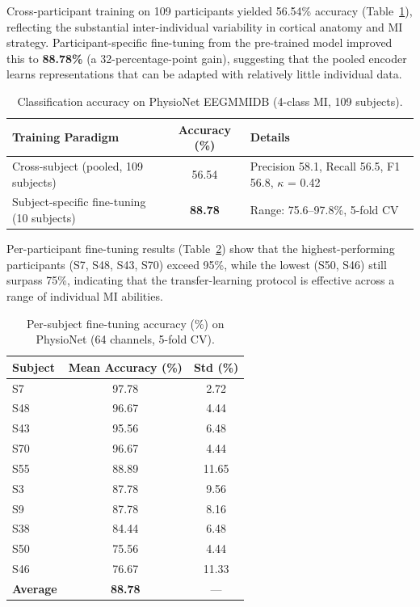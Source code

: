 \documentclass[12pt, a4paper]{article}
\begin{document}
Cross-participant training on 109 participants yielded 56.54\% accuracy (Table~\ref{tab:physionet_results}), reflecting the substantial inter-individual variability in cortical anatomy and MI strategy. Participant-specific fine-tuning from the pre-trained model improved this to \textbf{88.78\%} (a 32-percentage-point gain), suggesting that the pooled encoder learns representations that can be adapted with relatively little individual data.

\begin{table}[htbp]
\centering
\caption{Classification accuracy on PhysioNet EEGMMIDB (4-class MI, 109 subjects).}
\label{tab:physionet_results}
\begin{tabular}{@{} l c >{\raggedright\arraybackslash}p{6.5cm} @{}}
\toprule
\textbf{Training Paradigm} & \textbf{Accuracy (\%)} & \textbf{Details} \\
\midrule
Cross-subject (pooled, 109 subjects) & 56.54 & Precision 58.1, Recall 56.5, F1 56.8, $\kappa$ = 0.42 \\
Subject-specific fine-tuning (10 subjects) & \textbf{88.78} & Range: 75.6--97.8\%, 5-fold CV \\
\bottomrule
\end{tabular}
\end{table}

Per-participant fine-tuning results (Table~\ref{tab:finetune_detail}) show that the highest-performing participants (S7, S48, S43, S70) exceed 95\%, while the lowest (S50, S46) still surpass 75\%, indicating that the transfer-learning protocol is effective across a range of individual MI abilities.

\begin{table}[htbp]
\centering
\caption{Per-subject fine-tuning accuracy (\%) on PhysioNet (64 channels, 5-fold CV).}
\label{tab:finetune_detail}
\begin{tabular}{lcc}
\toprule
\textbf{Subject} & \textbf{Mean Accuracy (\%)} & \textbf{Std (\%)} \\
\midrule
S7  & 97.78 & 2.72 \\
S48 & 96.67 & 4.44 \\
S43 & 95.56 & 6.48 \\
S70 & 96.67 & 4.44 \\
S55 & 88.89 & 11.65 \\
S3  & 87.78 & 9.56 \\
S9  & 87.78 & 8.16 \\
S38 & 84.44 & 6.48 \\
S50 & 75.56 & 4.44 \\
S46 & 76.67 & 11.33 \\
\midrule
\textbf{Average} & \textbf{88.78} & --- \\
\bottomrule
\end{tabular}
\end{table}
\end{document}

